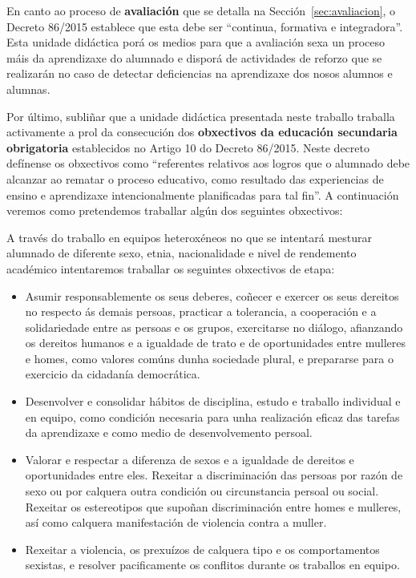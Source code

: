En canto ao proceso de \textbf{avaliación} que se detalla na Sección~\ref{sec:avaliacion}, o Decreto 86/2015 establece que esta debe ser ``continua, formativa e integradora''.  Esta unidade didáctica porá os medios para que a avaliación sexa un proceso máis da aprendizaxe do alumnado e disporá de actividades de reforzo que se realizarán no caso de detectar deficiencias na aprendizaxe dos nosos alumnos e alumnas.

Por último, subliñar que a unidade didáctica presentada neste traballo traballa activamente a prol da consecución dos \textbf{obxectivos da educación secundaria obrigatoria} establecidos no Artigo 10 do Decreto 86/2015. Neste decreto defínense os obxectivos como ``referentes relativos aos logros que o alumnado debe alcanzar ao rematar o proceso educativo, como resultado das experiencias de ensino e aprendizaxe intencionalmente planificadas para tal fin''. A continuación veremos como pretendemos traballar algún dos seguintes obxectivos:

A través do traballo en equipos heteroxéneos no que se intentará mesturar alumnado de diferente sexo, etnia, nacionalidade e nivel de rendemento académico intentaremos traballar os seguintes obxectivos de etapa:

\begin{itemize}
    \item Asumir responsablemente os seus deberes, coñecer e exercer os seus dereitos no respecto ás demais persoas, practicar a tolerancia, a cooperación e a solidariedade entre as persoas e os grupos, exercitarse no diálogo, afianzando os dereitos humanos e a igualdade de trato e de oportunidades entre mulleres e homes, como valores comúns dunha sociedade plural, e prepararse para o exercicio da cidadanía democrática.

    \item Desenvolver e consolidar hábitos de disciplina, estudo e traballo individual e en equipo, como condición necesaria para unha realización eficaz das tarefas da aprendizaxe e como medio de desenvolvemento persoal.

    \item Valorar e respectar a diferenza de sexos e a igualdade de dereitos e oportunidades entre eles. Rexeitar a discriminación das persoas por razón de sexo ou por calquera outra condición ou circunstancia persoal ou social. Rexeitar os estereotipos que supoñan discriminación entre homes e mulleres, así como calquera manifestación de violencia contra a muller.

    \item Rexeitar a violencia, os prexuízos de calquera tipo e os comportamentos sexistas, e resolver pacificamente os conflitos durante os traballos en equipo.
\end{itemize}

